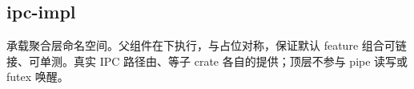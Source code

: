 
\subsection{ipc-impl}

承载聚合层命名空间。父组件在下执行，与占位对称，保证默认 feature 组合可链接、可单测。真实 IPC 路径由、等子 crate 各自的提供；顶层不参与 pipe 读写或 futex 唤醒。


